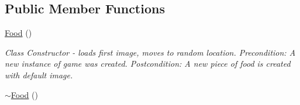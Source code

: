 \subsection*{\-Public \-Member \-Functions}
\begin{DoxyCompactItemize}
\item 
\hypertarget{classFood_a75d4d7f76fd495cc8133302ca9fdc485}{\hyperlink{classFood_a75d4d7f76fd495cc8133302ca9fdc485}{\-Food} ()}\label{classFood_a75d4d7f76fd495cc8133302ca9fdc485}

\begin{DoxyCompactList}\small\item\em \-Class \-Constructor -\/ loads first image, moves to random location. \-Precondition\-: \-A new instance of game was created. \-Postcondition\-: \-A new piece of food is created with default image. \end{DoxyCompactList}\item 
\hypertarget{classFood_a6f25dffd1fb347c982a53b9a384c611a}{\hyperlink{classFood_a6f25dffd1fb347c982a53b9a384c611a}{$\sim$\-Food} ()}\label{classFood_a6f25dffd1fb347c982a53b9a384c611a}


\end{DoxyCompactItemize}
